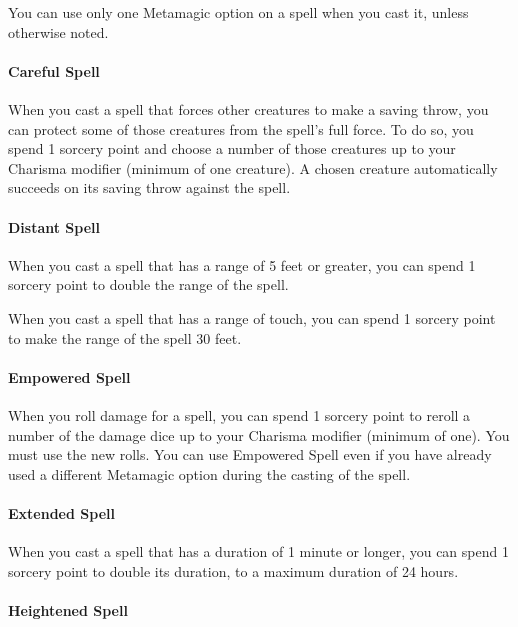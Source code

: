 \documentclass[
]{article}
\begin{document}
You can use only one Metamagic option on a spell when you cast it,
unless otherwise noted.

\hypertarget{careful-spell}{%
\paragraph{Careful Spell}\label{careful-spell}}

When you cast a spell that forces other creatures to make a saving
throw, you can protect some of those creatures from the spell's full
force. To do so, you spend 1 sorcery point and choose a number of those
creatures up to your Charisma modifier (minimum of one creature). A
chosen creature automatically succeeds on its saving throw against the
spell.

\hypertarget{distant-spell}{%
\paragraph{Distant Spell}\label{distant-spell}}

When you cast a spell that has a range of 5 feet or greater, you can
spend 1 sorcery point to double the range of the spell.

When you cast a spell that has a range of touch, you can spend 1 sorcery
point to make the range of the spell 30 feet.

\hypertarget{empowered-spell}{%
\paragraph{Empowered Spell}\label{empowered-spell}}

When you roll damage for a spell, you can spend 1 sorcery point to
reroll a number of the damage dice up to your Charisma modifier (minimum
of one). You must use the new rolls. You can use Empowered Spell even if
you have already used a different Metamagic option during the casting of
the spell.

\hypertarget{extended-spell}{%
\paragraph{Extended Spell}\label{extended-spell}}

When you cast a spell that has a duration of 1 minute or longer, you can
spend 1 sorcery point to double its duration, to a maximum duration of
24 hours.

\hypertarget{heightened-spell}{%
\paragraph{Heightened Spell}\label{heightened-spell}}
\end{document}
